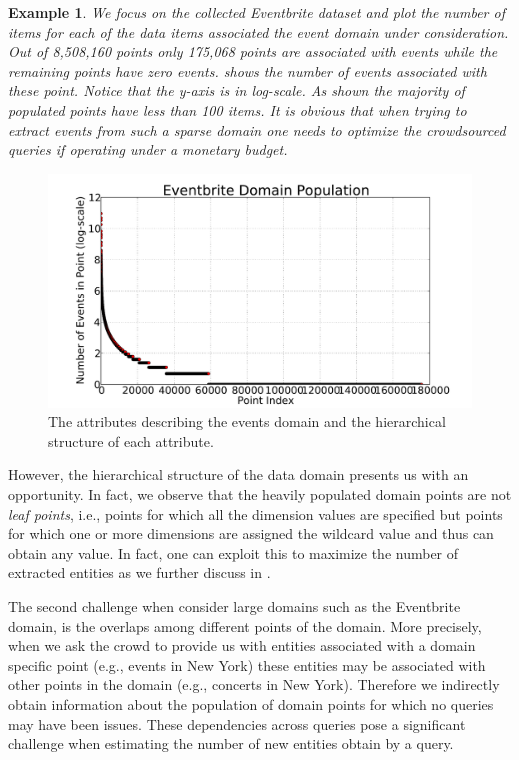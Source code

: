 \documentclass{vldb}
\newtheorem{example}{Example}
\begin{document}
\begin{example}
We focus on the collected Eventbrite dataset and plot the number of items for each of the data items associated the event domain under consideration. Out of 8,508,160 points only 175,068 points are associated with events while the remaining points have zero events.  shows the number of events associated with these point. Notice that the y-axis is in log-scale. As shown the majority of populated points have less than 100 items. It is obvious that when trying to extract events from such a sparse domain one needs to optimize the crowdsourced queries if operating under a monetary budget.
\end{example}

\begin{figure}
	\begin{center}
	\includegraphics[trim=55 0 62 0,clip,scale=0.25]{figs/eventBritePopulationS.pdf}
	\caption{The attributes describing the events domain and the hierarchical structure of each attribute.}
	\label{fig:eventbritepop}
	\vspace{-20pt}
	\end{center}
\end{figure}

However, the hierarchical structure of the data domain presents us with an opportunity. In fact, we observe that the heavily populated domain points are not {\em leaf points}, i.e., points for which all the dimension values are specified but points for which one or more dimensions are assigned the wildcard value and thus can obtain any value. In fact, one can exploit this to maximize the number of extracted entities as we further discuss in .

The second challenge when consider large domains such as the Eventbrite domain, is the overlaps among different points of the domain. More precisely, when we ask the crowd to provide us with entities associated with a domain specific point (e.g., events in New York) these entities may be associated with other points in the domain (e.g., concerts in New York). Therefore we indirectly obtain information about the population of domain points for which no queries may have been issues. 
These dependencies across queries pose a significant challenge when estimating the number of new entities obtain by a query.
\end{document}
